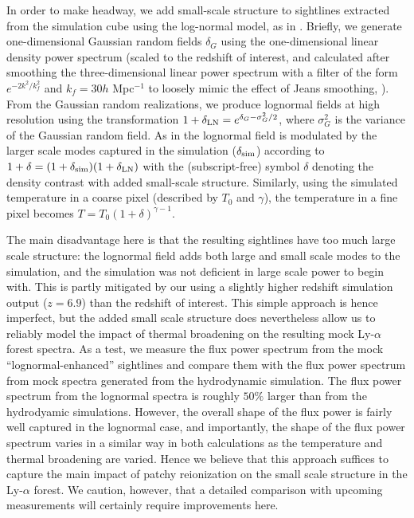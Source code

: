 In order to make headway, we add small-scale structure to sightlines extracted from the simulation cube using the log-normal model, as in
\citet{2007ApJ...657...15K}. Briefly, we generate one-dimensional Gaussian random fields $\delta_G$ using the one-dimensional linear density power spectrum 
(scaled to the redshift of interest, and calculated after smoothing the three-dimensional linear power spectrum with a filter of the form $e^{-2 k^2/k_f^2}$ and $k_f = 30 h$ Mpc$^{-1}$ to loosely mimic the effect
of Jeans smoothing, \citealt{Gnedin:1997td}). From the Gaussian random realizations, we produce lognormal fields at high resolution using the transformation
$1 + \delta_{\rm LN} = e^{\delta_G - \sigma_G^2/2}$, where $\sigma_G^2$ is the variance of the Gaussian random field. As in \citet{2007ApJ...657...15K}
the lognormal field is modulated by the larger scale modes captured in the simulation ($\delta_{\rm sim}$) according to $1 + \delta = (1 + \delta_{\rm sim}) (1 + \delta_{\rm LN})$ with the (subscript-free) symbol $\delta$ denoting the density contrast with added small-scale structure. Similarly, using the simulated temperature in a coarse pixel (described by $T_0$ and $\gamma$), the temperature in 
a fine pixel becomes $T = T_0 (1+ \delta)^{\gamma-1}$.

The main disadvantage here is that the resulting sightlines have too much large scale structure: the lognormal field adds both large and small
scale modes to the simulation, and the simulation was not deficient in large scale power to begin with. This is partly mitigated by our using
a slightly higher redshift simulation output ($z=6.9$) than the redshift of interest. 
This simple approach is hence
imperfect, but the added small scale structure does nevertheless allow us to reliably model the impact of
thermal broadening on the resulting mock Ly-$\alpha$ forest spectra. As a test, we measure the flux power spectrum from the mock ``lognormal-enhanced'' sightlines and compare them with the flux power spectrum from mock spectra generated from the hydrodynamic simulation. The flux power spectrum from the
lognormal spectra is roughly $50\%$ larger than from the hydrodyamic simulations. However, the overall shape of the flux power is fairly well
captured in the lognormal case, and importantly, the shape of the flux power spectrum varies in a similar way in both calculations as
the temperature and thermal broadening are varied. Hence we believe that this approach suffices to capture the main impact of patchy reionization on
the small scale structure in the Ly-$\alpha$ forest. We caution, however, that a detailed comparison with upcoming measurements will certainly require
improvements here.

